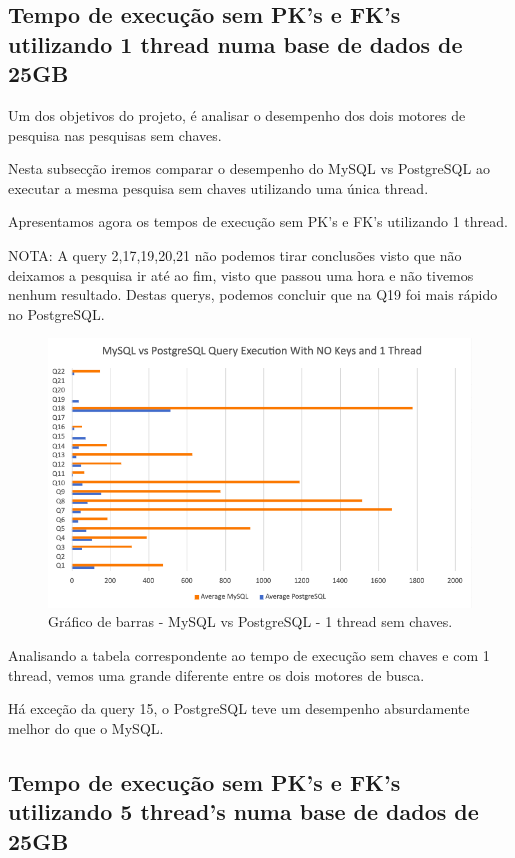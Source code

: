 \documentclass{article}
\begin{document}
\clearpage
\subsection{Tempo de execução sem PK's e FK's utilizando 1 thread numa base
de dados de 25GB}

Um dos objetivos do projeto, é analisar o desempenho dos dois motores de pesquisa nas pesquisas sem chaves.

Nesta subsecção iremos comparar o desempenho do MySQL vs PostgreSQL ao executar a mesma pesquisa sem chaves utilizando uma única thread.

Apresentamos agora os tempos de execução sem PK's e FK's utilizando 1 thread.

NOTA: A query 2,17,19,20,21 não podemos tirar conclusões visto que não deixamos a pesquisa ir até ao fim, visto que passou uma hora e não tivemos nenhum resultado. Destas querys, podemos concluir que na Q19 foi mais rápido no PostgreSQL.
\begin{figure}[H]
  \centering
  \includegraphics[width=\textwidth]{Graphs/mysqlvspostgres_withoutkeys_onethread.png}
  \caption{Gráfico de barras - MySQL vs PostgreSQL - 1 thread sem chaves.}
  \label{fig:PKCreation2}
\end{figure}

Analisando a tabela correspondente ao tempo de execução sem chaves e com 1 thread, vemos uma grande diferente entre os dois motores de busca.

Há exceção da query 15, o PostgreSQL teve um desempenho absurdamente melhor do que o MySQL.



\clearpage
\subsection{Tempo de execução sem PK's e FK's utilizando 5 thread's numa base
de dados de 25GB}
\end{document}
